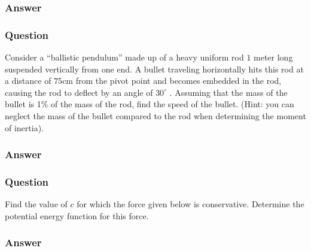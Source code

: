 \subsubsection{Answer}



\subsubsection{Question}
Consider a ``ballistic pendulum'' made up of a heavy uniform rod $1$ meter long suspended vertically from one end. A bullet traveling horizontally hits this rod at a distance of $75$cm from the pivot point and becomes embedded in the rod, causing the rod to deflect by an angle of $30^\circ$ . Assuming that the mass of the bullet is 1\% of the mass of the rod, find the speed of the bullet. (Hint: you can neglect the mass of the bullet compared to the rod when determining the moment of inertia).
\subsubsection{Answer}



\subsubsection{Question}
Find the value of $c$ for which the force given below is conservative. Determine the potential energy function for this force.
\subsubsection{Answer}


